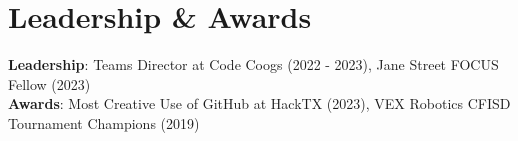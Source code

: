 \section{Leadership \& Awards}
\begin{itemize}[leftmargin=0.15in, label={}]
    \small{\item{     
        \textbf{Leadership}{: Teams Director at Code Coogs (2022 - 2023), Jane Street FOCUS Fellow (2023)} \\
     
        \textbf{Awards}{: {Most Creative Use of GitHub at HackTX (2023), VEX Robotics CFISD Tournament Champions (2019)}}
    }}
\end{itemize}